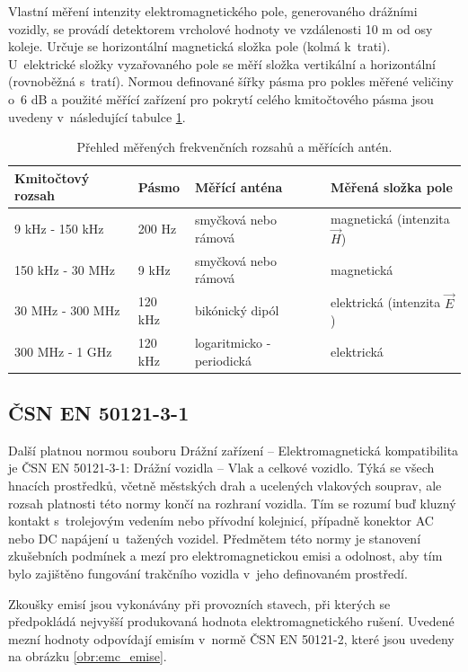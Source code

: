 Vlastní měření intenzity elektromagnetického pole, generovaného drážními vozidly, se provádí detektorem vrcholové hodnoty ve vzdálenosti 10 m od osy koleje. Určuje se horizontální magnetická složka pole (kolmá k~trati). U~elektrické složky vyzařovaného pole se měří složka vertikální a horizontální (rovnoběžná s~tratí). Normou definované šířky pásma pro pokles měřené veličiny o~6 dB  a použité měřící zařízení pro pokrytí celého kmitočtového pásma jsou uvedeny v~následující tabulce \ref{tab:emc_fr_rozsah}.

\begin{table}[!h]
\begin{center}
  	\caption{Přehled měřených frekvenčních rozsahů a měřících antén.}
  	\label{tab:emc_fr_rozsah}
\begin{tabular}{|l|l|l|l|}
	\hline
	{\bf Kmitočtový rozsah} & {\bf Pásmo} & {\bf Měřící anténa} & {\bf Měřená složka pole} \\
	\hline
	\hline
	9 kHz - 150 kHz	& 200 Hz	& smyčková nebo rámová	& magnetická (intenzita $\vec H$) \\
	150 kHz - 30 MHz	& 9 kHz	& smyčková nebo rámová	& magnetická \\
	30 MHz - 300 MHz	& 120 kHz	& bikónický dipól		& elektrická (intenzita $\vec E$) \\
	300 MHz - 1 GHz	& 120 kHz	& logaritmicko - periodická	& elektrická\\
  	\hline
\end{tabular}
\end{center}
\end{table}

\subsection{ČSN EN 50121-3-1}
Další platnou normou souboru Drážní zařízení – Elektromagnetická kompatibilita je ČSN EN 50121-3-1: Drážní vozidla – Vlak a celkové vozidlo. Týká se všech hnacích prostředků, včetně městských drah a ucelených vlakových souprav, ale rozsah platnosti této normy končí na rozhraní vozidla. Tím se rozumí buď kluzný kontakt s~trolejovým vedením nebo přívodní kolejnicí, případně konektor AC nebo DC napájení u~tažených vozidel. Předmětem této normy je stanovení zkušebních podmínek a mezí pro elektromagnetickou emisi a odolnost, aby tím bylo zajištěno fungování trakčního vozidla v~jeho definovaném prostředí. 

Zkoušky emisí jsou vykonávány při provozních stavech, při kterých se předpokládá nejvyšší produkovaná hodnota elektromagnetického rušení. Uvedené mezní hodnoty odpovídají emisím v~normě ČSN EN 50121-2, které jsou uvedeny na obrázku \ref{obr:emc_emise}.

